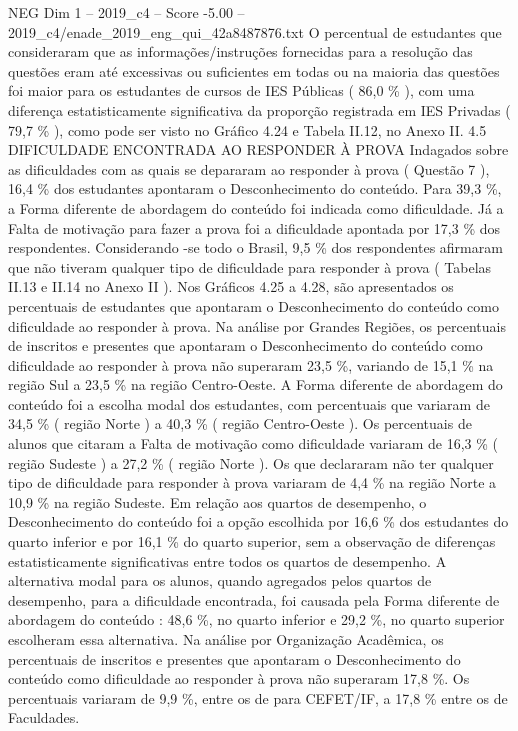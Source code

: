 \begin{textsample}{NEG Dim 1 – 2019\_c4 – Score -5.00 – 2019\_c4/enade\_2019\_eng\_qui\_42a8487876.txt}
O percentual de estudantes que consideraram que as informações/instruções fornecidas para a resolução das questões eram até excessivas ou suficientes em todas ou na maioria das questões foi maior para os estudantes de cursos de IES Públicas ( 86,0 \% ), com uma diferença estatisticamente significativa da proporção registrada em IES Privadas ( 79,7 \% ), como pode ser visto no Gráfico 4.24 e Tabela II.12, no Anexo II. 4.5 DIFICULDADE ENCONTRADA AO RESPONDER À PROVA Indagados sobre as dificuldades com as quais se depararam ao responder à prova ( Questão 7 ), 16,4 \% dos estudantes apontaram o Desconhecimento do conteúdo.
Para 39,3 \%, a Forma diferente de abordagem do conteúdo foi indicada como dificuldade.
Já a Falta de motivação para fazer a prova foi a dificuldade apontada por 17,3 \% dos respondentes.
Considerando -se todo o Brasil, 9,5 \% dos respondentes afirmaram que não tiveram qualquer tipo de dificuldade para responder à prova ( Tabelas II.13 e II.14 no Anexo II ).
Nos Gráficos 4.25 a 4.28, são apresentados os percentuais de estudantes que apontaram o Desconhecimento do conteúdo como dificuldade ao responder à prova.
Na análise por Grandes Regiões, os percentuais de inscritos e presentes que apontaram o Desconhecimento do conteúdo como dificuldade ao responder à prova não superaram 23,5 \%, variando de 15,1 \% na região Sul a 23,5 \% na região Centro-Oeste.
A Forma diferente de abordagem do conteúdo foi a escolha modal dos estudantes, com percentuais que variaram de 34,5 \% ( região Norte ) a 40,3 \% ( região Centro-Oeste ).
Os percentuais de alunos que citaram a Falta de motivação como dificuldade variaram de 16,3 \% ( região Sudeste ) a 27,2 \% ( região Norte ).
Os que declararam não ter qualquer tipo de dificuldade para responder à prova variaram de 4,4 \% na região Norte a 10,9 \% na região Sudeste.
Em relação aos quartos de desempenho, o Desconhecimento do conteúdo foi a opção escolhida por 16,6 \% dos estudantes do quarto inferior e por 16,1 \% do quarto superior, sem a observação de diferenças estatisticamente significativas entre todos os quartos de desempenho.
A alternativa modal para os alunos, quando agregados pelos quartos de desempenho, para a dificuldade encontrada, foi causada pela Forma diferente de abordagem do conteúdo : 48,6 \%, no quarto inferior e 29,2 \%, no quarto superior escolheram essa alternativa.
Na análise por Organização Acadêmica, os percentuais de inscritos e presentes que apontaram o Desconhecimento do conteúdo como dificuldade ao responder à prova não superaram 17,8 \%.
Os percentuais variaram de 9,9 \%, entre os de para CEFET/IF, a 17,8 \% entre os de Faculdades.

\end{textsample}
